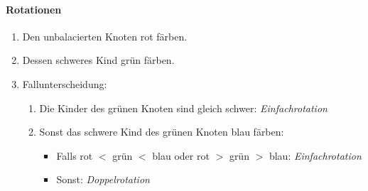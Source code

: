 \documentclass[a4paper, 9pt, DIV=20]{scrartcl}
\begin{document}
\paragraph{Rotationen}
\begin{enumerate}
\item Den unbalacierten Knoten rot färben.
\item Dessen schweres Kind grün färben.
\item Fallunterscheidung:
\begin{enumerate}
\item Die Kinder des grünen Knoten sind gleich schwer: \emph{Einfachrotation}
\item Sonst das schwere Kind des grünen Knoten blau färben:
\begin{itemize}
\item Falls rot $<$ grün $<$ blau oder rot $>$ grün $>$ blau: \emph{Einfachrotation}
\item Sonst: \emph{Doppelrotation}
\end{itemize}
\end{enumerate}
\end{enumerate}


\end{document}
